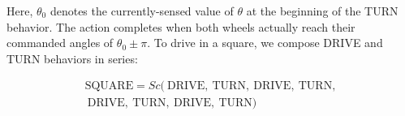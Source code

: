 \documentclass[conference]{IEEEtran}
\theoremstyle{definition}
\begin{document}
Here, \(\theta_0\) denotes the currently-sensed value of $\theta$ at the beginning of
the TURN behavior.
The action completes when both wheels actually reach their commanded angles of \(\theta_0\pm\pi\). To drive in a square, we compose DRIVE and TURN behaviors in series:

\begin{align*}
\mathrm{SQUARE} = Sc (~\mathrm{DRIVE},~\mathrm{TURN},~\mathrm{DRIVE},~\mathrm{TURN},\\
~\mathrm{DRIVE},~\mathrm{TURN},~\mathrm{DRIVE},~\mathrm{TURN} )
\end{align*}

% 
% 
\end{document}
